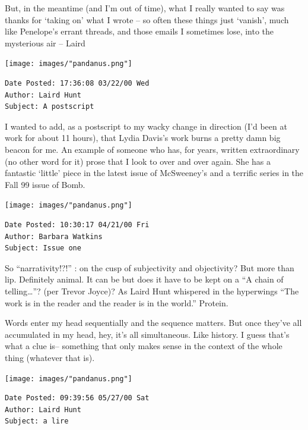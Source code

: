 \documentclass[
]{memoir}
\begin{document}
But, in the meantime (and I'm out of time), what I really wanted to say
was thanks for `taking on' what I wrote -- so often these things just
`vanish', much like Penelope's errant threads, and those emails I
sometimes lose, into the mysterious air -- Laird

\begin{center}\texttt{[image: images/"pandanus.png"]}\end{center}

\begin{verbatim}
Date Posted: 17:36:08 03/22/00 Wed
Author: Laird Hunt
Subject: A postscript
\end{verbatim}

I wanted to add, as a postscript to my wacky change in direction (I'd
been at work for about 11 hours), that Lydia Davis's work burns a pretty
damn big beacon for me. An example of someone who has, for years,
written extraordinary (no other word for it) prose that I look to over
and over again. She has a fantastic `little' piece in the latest issue
of McSweeney's and a terrific series in the Fall 99 issue of Bomb.

\begin{center}\texttt{[image: images/"pandanus.png"]}\end{center}

\begin{verbatim}
Date Posted: 10:30:17 04/21/00 Fri
Author: Barbara Watkins
Subject: Issue one
\end{verbatim}

So ``narrativity!?!'' : on the cusp of subjectivity and objectivity? But
more than lip. Definitely animal. It can be but does it have to be kept
on a ``A chain of telling\ldots{}''? (per Trevor Joyce)? As Laird Hunt
whispered in the hyperwings ``The work is in the reader and the reader
is in the world.'' Protein.

Words enter my head sequentially and the sequence matters. But once
they've all accumulated in my head, hey, it's all simultaneous. Like
history. I guess that's what a clue is-- something that only makes sense
in the context of the whole thing (whatever that is).

\begin{center}\texttt{[image: images/"pandanus.png"]}\end{center}

\begin{verbatim}
Date Posted: 09:39:56 05/27/00 Sat
Author: Laird Hunt
Subject: a lire
\end{verbatim}
\end{document}
